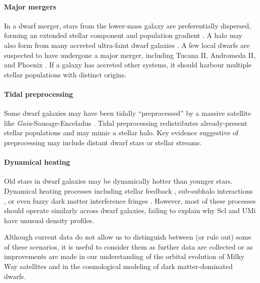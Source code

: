 \documentclass[times,trackchanges, twocolumn, twocolappendix]{aastex701}
\begin{document}
\paragraph{Major mergers} In a dwarf merger, stars from
the lower-mass galaxy are preferentially dispersed, forming an extended
stellar component and population gradient
\citep{benitez-llambay+2016, deason+2022}. A halo may also form from many accreted ultra-faint dwarf galaxies \citep{ricotti+polisensky+cleland2022}. A few local dwarfs are
suspected to have undergone a major merger, including Tucana II,
Andromeda II, and Phoenix
\citep{lokas+2014, fouquet+2017, tarumi+yoshida+frebel2021, cardona-barrero+2021, querci+2025}.
If a galaxy has accreted other systems, it should harbour multiple stellar populations with distinct origins.

\paragraph{Tidal preprocessing} Some dwarf galaxies may have been tidally
``preprocessed'' by a massive satellite like \textit{Gaia}-Sausage-Enceladus
\citep[e.g.,][]{santistevan+2023, riley+2024}. Tidal preprocessing
redistributes already-present stellar populations and may mimic a
stellar halo. Key evidence suggestive of preprocessing may include
distant dwarf stars or stellar streams.

\paragraph{Dynamical heating} Old stars in dwarf galaxies may be
dynamically hotter than younger stars. Dynamical heating processes including
stellar feedback \citep{stinson+2009, maxwell+2012, el-badry+2016,
mercado+2021}, sub-subhalo interactions \citep{penarrubia+2025}, or even fuzzy
dark matter interference fringes \citep[e.g.,][]{el-zant+2020,
duttachowdhury+2023}. However, most of these processes should operate similarly
across dwarf galaxies, failing to explain why Scl and UMi have unusual density profiles.


Although current data do not allow us to distinguish between (or rule out) some of these scenarios, it is useful to consider them as further data are collected or as improvements are made in our understanding of the orbital evolution of Milky Way satellites and in the cosmological modeling of dark matter-dominated dwarfs.



\end{document}
